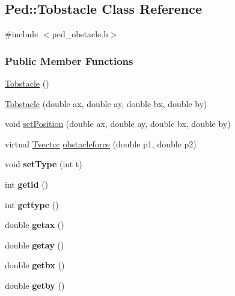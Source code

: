\hypertarget{classPed_1_1Tobstacle}{
\subsection{Ped::Tobstacle Class Reference}
\label{classPed_1_1Tobstacle}
}


{\ttfamily \#include $<$ped\_\-obstacle.h$>$}

\subsubsection*{Public Member Functions}
\begin{DoxyCompactItemize}
\item 
\hyperlink{classPed_1_1Tobstacle_a0406b1832f93f5106e0be5f7b1e5ff60}{Tobstacle} ()
\item 
\hyperlink{classPed_1_1Tobstacle_a9c11132d8c77f951871e989d0c1921f5}{Tobstacle} (double ax, double ay, double bx, double by)
\item 
void \hyperlink{classPed_1_1Tobstacle_a506b8a36d89c099b6793cd3c9f7ee998}{setPosition} (double ax, double ay, double bx, double by)
\item 
virtual \hyperlink{classPed_1_1Tvector}{Tvector} \hyperlink{classPed_1_1Tobstacle_a471b65644223274c4615179f43bd7f6f}{obstacleforce} (double p1, double p2)
\item 
\hypertarget{classPed_1_1Tobstacle_ae99ac55ee33510b3b59294d5d741ddce}{
void {\bfseries setType} (int t)}
\label{classPed_1_1Tobstacle_ae99ac55ee33510b3b59294d5d741ddce}

\item 
\hypertarget{classPed_1_1Tobstacle_ab4af55bf9124074513d90a8baec39616}{
int {\bfseries getid} ()}
\label{classPed_1_1Tobstacle_ab4af55bf9124074513d90a8baec39616}

\item 
\hypertarget{classPed_1_1Tobstacle_af65f8ec7e2a4255a8525138d08eae4be}{
int {\bfseries gettype} ()}
\label{classPed_1_1Tobstacle_af65f8ec7e2a4255a8525138d08eae4be}

\item 
\hypertarget{classPed_1_1Tobstacle_a97c9fde4fde2d9fca97bfdc3679f2626}{
double {\bfseries getax} ()}
\label{classPed_1_1Tobstacle_a97c9fde4fde2d9fca97bfdc3679f2626}

\item 
\hypertarget{classPed_1_1Tobstacle_aea7ef9186722ff8bf141cd82e93c3c41}{
double {\bfseries getay} ()}
\label{classPed_1_1Tobstacle_aea7ef9186722ff8bf141cd82e93c3c41}

\item 
\hypertarget{classPed_1_1Tobstacle_ae339d0346712c40bde759b59d7a744cb}{
double {\bfseries getbx} ()}
\label{classPed_1_1Tobstacle_ae339d0346712c40bde759b59d7a744cb}

\item 
\hypertarget{classPed_1_1Tobstacle_a398160f2fc30542b62e3699fb8c34ac0}{
double {\bfseries getby} ()}
\label{classPed_1_1Tobstacle_a398160f2fc30542b62e3699fb8c34ac0}

\end{DoxyCompactItemize}


